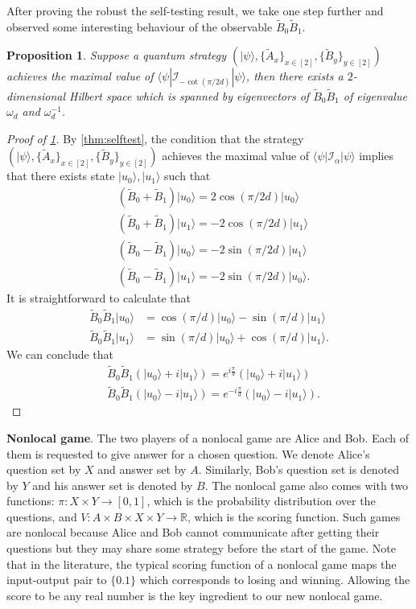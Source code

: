 \documentclass[11pt,letterpaper]{article}
\newcommand{\ket}[1]{|#1\rangle}
\newcommand{\bra}[1]{\langle#1|}
\newcommand{\R}{\mathbb{R}}
\newcommand{\1}{\mathbb{1}}
\newcommand{\I}{\mathcal{I}}
\newtheorem{proposition}[theorem]{Proposition}
\theoremstyle{definition}
\begin{document}
After proving the robust the self-testing result, we take one step further and observed some interesting behaviour of the 
observable $\tilde{B}_0\tilde{B}_1$.
\begin{proposition}
\label{prop:2d-subspace}
	Suppose a quantum strategy $(\ket{\psi}, \{\tilde{A}_x\}_{x \in [2]}, \{\tilde{B}_y\}_{y \in [2]})$ achieves the maximal 
	value of  $\bra{\psi}\I_{-\cot(\pi/2d)} \ket{\psi}$, then there exists a $2$-dimensional Hilbert space which is spanned by eigenvectors of 
	$\tilde{B}_0\tilde{B}_1$ of eigenvalue $\omega_d$ and $\omega_d^{-1}$.
\end{proposition}
\begin{proof}[Proof of \cref{prop:2d-subspace}]
	By \cref{thm:selftest}, the condition that the strategy $(\ket{\psi}, \{\tilde{A}_x\}_{x \in [2]}, \{\tilde{B}_y\}_{y \in [2]})$ achieves the  
	maximal value of $\bra{\psi}  \I_\alpha \ket{\psi} $ implies that there exists state $\ket{u_0}, \ket{u_1}$ such that 
	\begin{align*}
	&(\tilde{B}_0 + \tilde{B}_1) \ket{u_0} = 2\cos(\pi/2d) \ket{u_0} \\
	&(\tilde{B}_0 + \tilde{B}_1) \ket{u_1} = -2\cos(\pi/2d) \ket{u_1}\\
	&(\tilde{B}_0 - \tilde{B}_1) \ket{u_0} = -2\sin(\pi/2d) \ket{u_1} \\
	&(\tilde{B}_0 - \tilde{B}_1) \ket{u_1} = -2\sin(\pi/2d) \ket{u_0}.
	\end{align*}
	It is straightforward to calculate that 
	\begin{align}
		\tilde{B}_0\tilde{B}_1 \ket{u_0} &= \cos(\pi/d) \ket{u_0} -\sin(\pi/d) \ket{u_1}\\
		\tilde{B}_0\tilde{B}_1\ket{u_1} &= \sin(\pi/d)\ket{u_0} + \cos(\pi/d) \ket{u_1}.
	\end{align}
	We can conclude that 
	\begin{align}
		&\tilde{B}_0\tilde{B}_1(\ket{u_0} + i\ket{u_1}) = e^{i \frac{\pi}{d}} (\ket{u_0} + i\ket{u_1})\\
		&\tilde{B}_0\tilde{B}_1(\ket{u_0} - i\ket{u_1}) = e^{-i \frac{\pi}{d}} (\ket{u_0} - i\ket{u_1}).
	\end{align}
\end{proof}

\textbf{Nonlocal game}. The two players of a nonlocal game are Alice and Bob. Each of them is requested
to give answer for a chosen question. We denote Alice's question set by $X$ and answer set by $A$. Similarly,
Bob's question set is denoted by $Y$ and his answer set is denoted by $B$. The nonlocal game also
comes with two functions: $\pi: X \times Y \rightarrow [0,1]$, which is the probability distribution over the questions,
and $V: A \times B \times X \times Y \rightarrow \R$, which is the scoring function. Such games are nonlocal
because Alice and Bob cannot communicate after getting their questions but they may share some strategy before 
the start of the game. Note that in the literature, the typical scoring function of a nonlocal game maps the input-output
pair to $\{0.1\}$ which corresponds to losing and winning. Allowing the score to be any real number is the key ingredient 
to our new nonlocal game. 
\end{document}
